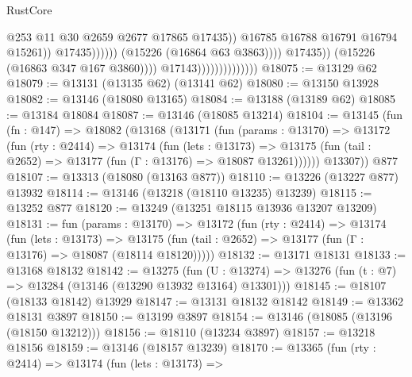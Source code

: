 \begin{lexlean}{RustCore}
\begin{coremodule}
                                                                @253
                                                                @11
                                                                @30
                                                                @2659
                                                                @2677
                                                                @17865
                                                                @17435))
                                                            @16785
                                                            @16788
                                                            @16791
                                                            @16794
                                                            @15261))
                                                        @17435))))))
                                            (@15226 (@16864 @63 @3863))))
                                        @17435))
                                    (@15226 (@16863 @347 @167 @3860))))
                                @17143))))))))))))))
@18075 := @13129 @62
@18079 := @13131 (@13135 @62) (@13141 @62)
@18080 := @13150 @13928
@18082 := @13146 (@18080 @13165)
@18084 := @13188 (@13189 @62)
@18085 := @13184 @18084
@18087 := @13146 (@18085 @13214)
@18104 := @13145
    (fun (fn : @147) =>
    @18082
      (@13168
        (@13171
          (fun (params : @13170) =>
          @13172
            (fun (rty : @2414) =>
            @13174
              (fun (lets : @13173) =>
              @13175 (fun (tail : @2652) => @13177 (fun (Γ : @13176) => @18087 @13261))))))
        @13307))
    @877
@18107 := @13313 (@18080 (@13163 @877))
@18110 := @13226 (@13227 @877) @13932
@18114 := @13146 (@13218 (@18110 @13235) @13239)
@18115 := @13252 @877
@18120 := @13249 (@13251 @18115 @13936 @13207 @13209)
@18131 := fun (params : @13170) =>
  @13172
    (fun (rty : @2414) =>
    @13174
      (fun (lets : @13173) =>
      @13175 (fun (tail : @2652) => @13177 (fun (Γ : @13176) => @18087 (@18114 @18120)))))
@18132 := @13171 @18131
@18133 := @13168 @18132
@18142 := @13275
    (fun (U : @13274) => @13276 (fun (t : @7) => @13284 (@13146 (@13290 @13932 @13164) @13301)))
@18145 := @18107 (@18133 @18142) @13929
@18147 := @13131 @18132 @18142
@18149 := @13362 @18131 @3897
@18150 := @13199 @3897
@18154 := @13146 (@18085 (@13196 (@18150 @13212)))
@18156 := @18110 (@13234 @3897)
@18157 := @13218 @18156
@18159 := @13146 (@18157 @13239)
@18170 := @13365
    (fun (rty : @2414) =>
    @13174
      (fun (lets : @13173) =>

\end{coremodule}
\end{lexlean}
